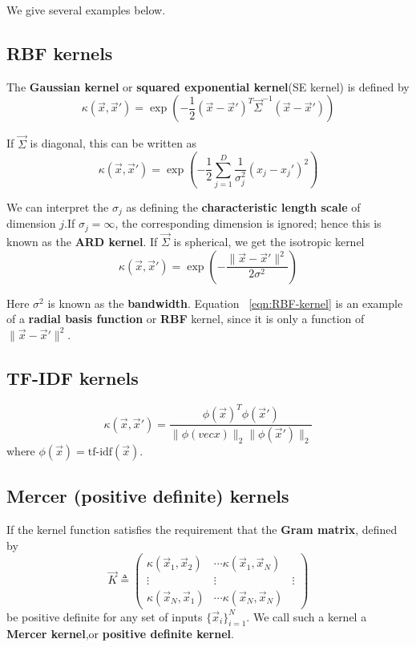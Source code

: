 We give several examples below.

\subsection{RBF kernels}
The \textbf{Gaussian kernel} or \textbf{squared exponential kernel}(SE kernel) is defined by
\begin{equation}
\kappa(\vec{x},\vec{x}')=\exp\left(-\frac{1}{2}(\vec{x}-\vec{x}')^T\vec{\Sigma}^{-1}(\vec{x}-\vec{x}')\right)
\end{equation}

If $\vec{\Sigma}$ is diagonal, this can be written as
\begin{equation}
\kappa(\vec{x},\vec{x}')=\exp\left(-\frac{1}{2}\sum\limits_{j=1}^D \frac{1}{\sigma_j^2}(x_j-x_j')^2\right)
\end{equation}

We can interpret the $\sigma_j$ as defining the \textbf{characteristic length scale} of dimension $j$.If $\sigma_j = \infty$, the corresponding dimension is ignored; hence this is known as the \textbf{ARD kernel}. If $\vec{\Sigma}$ is spherical, we get the isotropic kernel
\begin{equation}\label{eqn:RBF-kernel}
\kappa(\vec{x},\vec{x}')=\exp\left(-\frac{\lVert\vec{x}-\vec{x}'\rVert^2}{2\sigma^2}\right)
\end{equation}

Here $\sigma^2$ is known as the \textbf{bandwidth}. Equation ~\ref{eqn:RBF-kernel} is an example of a \textbf{radial basis function} or \textbf{RBF} kernel, since it is only a function of $\lVert\vec{x}-\vec{x}'\rVert^2$.


\subsection{TF-IDF kernels}
\begin{equation}\label{eqn:RBF-kernel}
\kappa(\vec{x},\vec{x}')=\frac{\phi(\vec{x})^T\phi(\vec{x}')}{\lVert\phi(vec{x})\rVert_2\lVert\phi(\vec{x}')\rVert_2}
\end{equation}
where $\phi(\vec{x})=\text{tf-idf}(\vec{x})$.

\subsection{Mercer (positive definite) kernels}
\label{sec:Mercer-kernels}
If the kernel function satisfies the requirement that the \textbf{Gram matrix}, defined by
\begin{equation}
\vec{K} \triangleq \left(\begin{array}{ccc}
\kappa(\vec{x}_1,\vec{x}_2) & \cdots \kappa(\vec{x}_1,\vec{x}_N) \\
\vdots & \vdots & \vdots \\
\kappa(\vec{x}_N,\vec{x}_1) & \cdots \kappa(\vec{x}_N,\vec{x}_N) 
\end{array}\right)
\end{equation}
be positive definite for any set of inputs $\{\vec{x}_i\}_{i=1}^N$. We call such a kernel a \textbf{Mercer kernel},or \textbf{positive definite kernel}.

